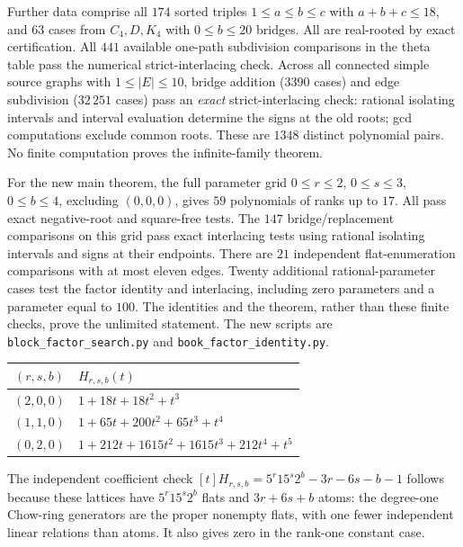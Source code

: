 \documentclass[12pt]{amsart}
\theoremstyle{definition}
\theoremstyle{remark}
\numberwithin{equation}{section}
\begin{document}
Further data comprise all $174$ sorted triples $1\leq a\leq b\leq c$ with $a+b+c\leq18$, and $63$ cases from $C_4,D,K_4$ with $0\leq b\leq20$ bridges. All are real-rooted by exact certification. All $441$ available one-path subdivision comparisons in the theta table pass the numerical strict-interlacing check. Across all connected simple source graphs with $1\leq|E|\leq10$, bridge addition ($3390$ cases) and edge subdivision ($32\,251$ cases) pass an \emph{exact} strict-interlacing check: rational isolating intervals and interval evaluation determine the signs at the old roots; gcd computations exclude common roots. These are $1348$ distinct polynomial pairs. No finite computation proves the infinite-family theorem.


For the new main theorem, the full parameter grid $0\leq r\leq2$, $0\leq s\leq3$, $0\leq b\leq4$, excluding $(0,0,0)$, gives $59$ polynomials of ranks up to $17$. All pass exact negative-root and square-free tests. The $147$ bridge/replacement comparisons on this grid pass exact interlacing tests using rational isolating intervals and signs at their endpoints. There are $21$ independent flat-enumeration comparisons with at most eleven edges. Twenty additional rational-parameter cases test the factor identity and interlacing, including zero parameters and a parameter equal to $100$. The identities and the theorem, rather than these finite checks, prove the unlimited statement. The new scripts are \texttt{block\_factor\_search.py} and \texttt{book\_factor\_identity.py}.
\begin{center}\small
\begin{tabular}{c|l}
$(r,s,b)$&$H_{r,s,b}(t)$\\\hline
$(2,0,0)$&$1+18t+18t^2+t^3$\\
$(1,1,0)$&$1+65t+200t^2+65t^3+t^4$\\
$(0,2,0)$&$1+212t+1615t^2+1615t^3+212t^4+t^5$
\end{tabular}
\end{center}
The independent coefficient check $[t]H_{r,s,b}=5^r15^s2^b-3r-6s-b-1$ follows because these lattices have $5^r15^s2^b$ flats and $3r+6s+b$ atoms: the degree-one Chow-ring generators are the proper nonempty flats, with one fewer independent linear relations than atoms. It also gives zero in the rank-one constant case.
\end{document}
